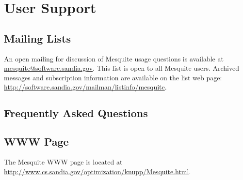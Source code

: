 \chapter{User Support}

\section{Mailing Lists}

An open mailing for discussion of Mesquite usage questions is available at
\href{mailto:mesquite@software.sandia.gov}{mesquite@software.sandia.gov}.  This list is open to all Mesquite users.  
Archived messages and subscription information are available on the list web 
page: \newline
\href{http://software.sandia.gov/mailman/listinfo/mesquite}{http://software.sandia.gov/mailman/listinfo/mesquite}.

\section{Frequently Asked Questions}

\section{WWW Page}

The Mesquite WWW page is located at \newline
\url{http://www.cs.sandia.gov/optimization/knupp/Mesquite.html}.
